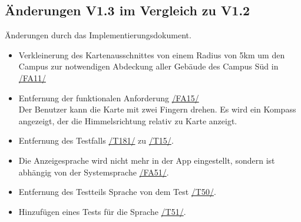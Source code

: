 \subsection*{Änderungen V1.3 im Vergleich zu V1.2}
Änderungen durch das Implementierungsdokument.
\begin{itemize}
    \item Verkleinerung des Kartenausschnittes von einem Radius von 5km um den \Gls{Campus} zur notwendigen Abdeckung aller Gebäude des \Gls{Campus} Süd in \hyperref[/FA11/]{/FA11/}
    \item Entfernung der funktionalen Anforderung \hyperref[/FA15/]{/FA15/} \\ Der \Gls{Benutzer} kann die \Gls{Karte} mit zwei Fingern drehen. Es wird ein Kompass angezeigt, der die Himmelsrichtung relativ zu \Gls{Karte} anzeigt.
    \item Entfernung des Testfalls \hyperref[/T181/]{/T181/} zu \hyperref[/T15/]{/T15/}.
    \item Die Anzeigesprache wird nicht mehr in der App eingestellt, sondern ist abhängig von der Systemsprache \hyperref[/FA51/]{/FA51/}.
    \item Entfernung des Testteils Sprache von dem Test \hyperref[/T50/]{/T50/}.
    \item Hinzufügen eines Tests für die Sprache \hyperref[/T51/]{/T51/}.
\end{itemize}